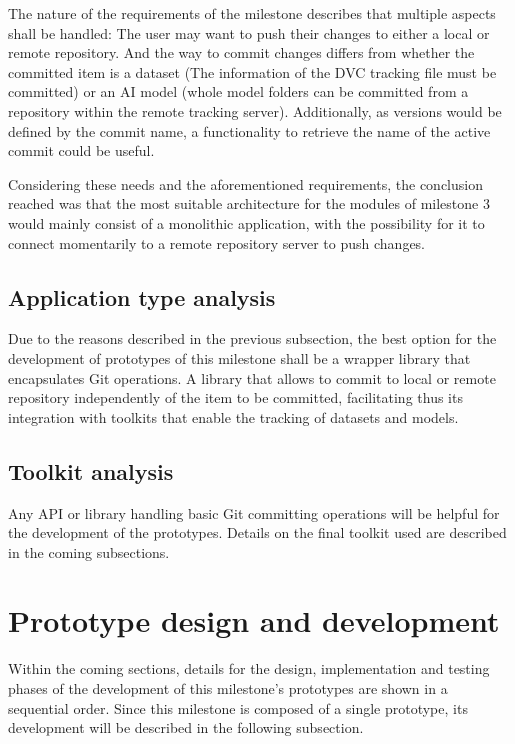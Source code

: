 The nature of the requirements of the milestone describes that multiple aspects shall be handled: The user may want to push their changes to either a local or remote repository. 
And the way to commit changes differs from whether the committed item is a dataset (The information of the DVC tracking file must be committed) or an \acrshort{AI} model (whole model folders can be committed from a repository within
the remote tracking server). Additionally, as versions would be defined by the commit name, a functionality to retrieve the name of the active commit could be useful.

Considering these needs and the aforementioned requirements, the conclusion reached was that the most suitable architecture for the modules of milestone 3 would mainly consist of
a monolithic application, with the possibility for it to connect momentarily to a remote repository server to push changes.

\subsection{Application type analysis}

Due to the reasons described in the previous subsection, the best option for the development of prototypes of this milestone shall be a wrapper library that encapsulates Git
operations. A library that allows to commit to local or remote repository independently of the item to be committed, facilitating thus its integration with toolkits that enable the 
tracking of datasets and models.

\subsection{Toolkit analysis}

Any API or library handling basic Git committing operations will be helpful for the development of the prototypes. Details on the final toolkit used are described in the coming subsections.

\section{Prototype design and development}

Within the coming sections, details for the design, implementation and testing phases of the development of this milestone's prototypes are shown in a sequential order. Since this milestone
is composed of a single prototype, its development will be described in the following subsection.

